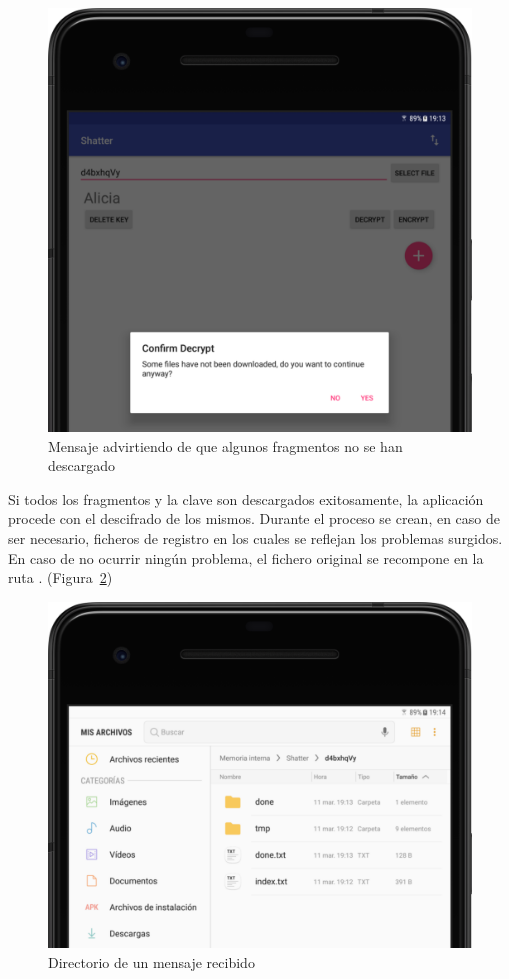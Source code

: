 \begin{figure}[!htb]
  \centering
  \includegraphics[scale=0.4]{Figures/miss}
  \decoRule
  \caption[Shatter (Faltan fragmentos)]{Mensaje advirtiendo de que algunos fragmentos no se han descargado}
  \label{fig:miss}
\end{figure}

Si todos los fragmentos y la clave son descargados exitosamente, la aplicación procede con el descifrado de los mismos. Durante el proceso se crean, en caso de ser necesario, ficheros de registro en los cuales se reflejan los problemas surgidos. En caso de no ocurrir ningún problema, el fichero original se recompone en la ruta . (Figura~\ref{fig:done})

\begin{figure}[!htb]
  \centering
  \includegraphics[scale=0.4]{Figures/done}
  \decoRule
  \caption[Shatter (Mensaje recibido)]{Directorio de un mensaje recibido}
  \label{fig:done}
\end{figure}


